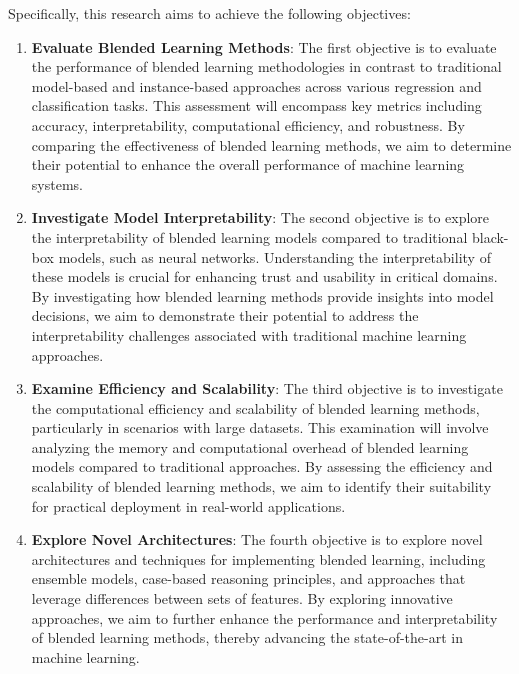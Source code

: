 \documentclass[a4paper, 12pt]{report}
\begin{document}
Specifically, this research aims to achieve the following objectives:

\begin{enumerate}
    \item \textbf{Evaluate Blended Learning Methods}: 
    The first objective is to evaluate the performance of blended learning methodologies in contrast to traditional 
    model-based and instance-based approaches across various regression and classification tasks. 
    This assessment will encompass key metrics including accuracy, interpretability, computational efficiency, and robustness. 
    By comparing the effectiveness of blended learning methods, we aim to determine their potential to enhance the overall performance of machine learning systems.
    
    \item \textbf{Investigate Model Interpretability}: 
    The second objective is to explore the interpretability of blended learning models compared to traditional black-box models, such as neural networks. 
    Understanding the interpretability of these models is crucial for enhancing trust and usability in critical domains. 
    By investigating how blended learning methods provide insights into model decisions, we aim to demonstrate their potential to address the interpretability 
    challenges associated with traditional machine learning approaches.
    
    \item \textbf{Examine Efficiency and Scalability}: 
    The third objective is to investigate the computational efficiency and scalability of blended learning methods, particularly in scenarios with large datasets. 
    This examination will involve analyzing the memory and computational overhead of blended learning models compared to traditional approaches. 
    By assessing the efficiency and scalability of blended learning methods, we aim to identify their suitability for practical deployment in real-world applications.
    
    \item \textbf{Explore Novel Architectures}: 
    The fourth objective is to explore novel architectures and techniques for implementing blended learning, 
    including ensemble models, case-based reasoning principles, and approaches that leverage differences between sets of features. 
    By exploring innovative approaches, we aim to further enhance the performance and interpretability of blended learning methods, 
    thereby advancing the state-of-the-art in machine learning.
    

\end{enumerate}
\end{document}
